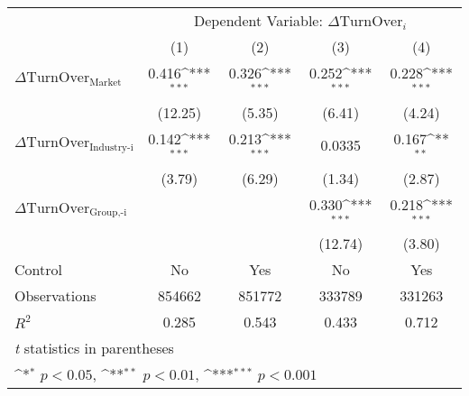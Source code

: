 {
\def\sym#1{\ifmmode^{#1}\else\(^{#1}\)\fi}
\begin{tabular}{l*{4}{c}}
\hline\hline
                    &\multicolumn{4}{c}{Dependent Variable: $\Delta \text{TurnOver}_{i} $ }                 \\\cmidrule(lr){2-5}
                    &\multicolumn{1}{c}{(1)}         &\multicolumn{1}{c}{(2)}         &\multicolumn{1}{c}{(3)}         &\multicolumn{1}{c}{(4)}         \\
\hline
 $ \Delta \text{TurnOver}_{\text{Market}} $ &       0.416\sym{***}&       0.326\sym{***}&       0.252\sym{***}&       0.228\sym{***}\\
                    &     (12.25)         &      (5.35)         &      (6.41)         &      (4.24)         \\
[1em]
 $ \Delta \text{TurnOver}_{\text{Industry-i}} $ &       0.142\sym{***}&       0.213\sym{***}&      0.0335         &       0.167\sym{**} \\
                    &      (3.79)         &      (6.29)         &      (1.34)         &      (2.87)         \\
[1em]
 $ \Delta \text{TurnOver}_{\text{Group,-i}} $ &                     &                     &       0.330\sym{***}&       0.218\sym{***}\\
                    &                     &                     &     (12.74)         &      (3.80)         \\
\hline
Control             &          No         &         Yes         &          No         &         Yes         \\
Observations        &      854662         &      851772         &      333789         &      331263         \\
$ R^2 $             &       0.285         &       0.543         &       0.433         &       0.712         \\
\hline\hline
\multicolumn{5}{l}{\footnotesize \textit{t} statistics in parentheses}\\
\multicolumn{5}{l}{\footnotesize \sym{*} \(p<0.05\), \sym{**} \(p<0.01\), \sym{***} \(p<0.001\)}\\
\end{tabular}
}
